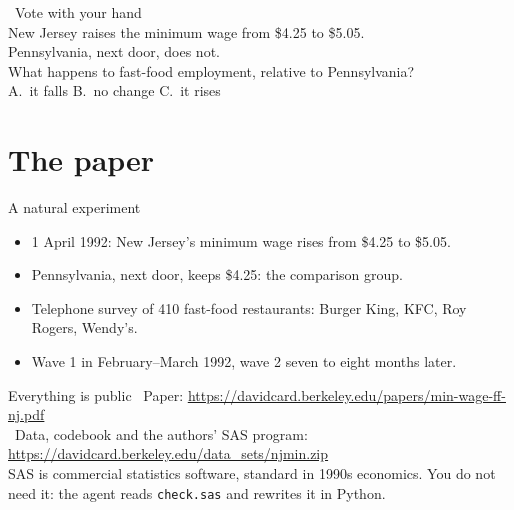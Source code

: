 \documentclass[aspectratio=169,11pt]{beamer}
\let\oldurl\url
\renewcommand{\url}[1]{{\color{linkblue}\uline{\oldurl{#1}}}}
\newcommand{\paperurl}{https://davidcard.berkeley.edu/papers/min-wage-ff-nj.pdf}
\newcommand{\dataurl}{https://davidcard.berkeley.edu/data_sets/njmin.zip}
\begin{document}
\begin{frame}[standout]
\faHandPaper[regular]\ Vote with your hand\\[1em]
\normalsize New Jersey raises the minimum wage from \$4.25 to \$5.05.\\
Pennsylvania, next door, does not.\\
What happens to fast-food employment, relative to Pennsylvania?\\[1em]
\large A.\ it falls \quad B.\ no change \quad C.\ it rises
\end{frame}

\section{The paper}

\begin{frame}{A natural experiment}
\begin{itemize}
\item 1 April 1992: New Jersey's minimum wage rises from \$4.25 to \$5.05.
\item Pennsylvania, next door, keeps \$4.25: the comparison group.
\item Telephone survey of 410 fast-food restaurants: Burger King, KFC, Roy Rogers, Wendy's.
\item Wave 1 in February--March 1992, wave 2 seven to eight months later.
\end{itemize}
\vspace{0.6em}
\begin{block}{Everything is public}
\small
\faFilePdf\ Paper: \url{\paperurl}\\[0.2em]
\faDatabase\ Data, codebook and the authors' SAS program: \url{\dataurl}\\[0.3em]
\footnotesize SAS is commercial statistics software, standard in 1990s economics. You do not need it: the agent reads \texttt{check.sas} and rewrites it in Python.
\end{block}
\end{frame}
\end{document}
